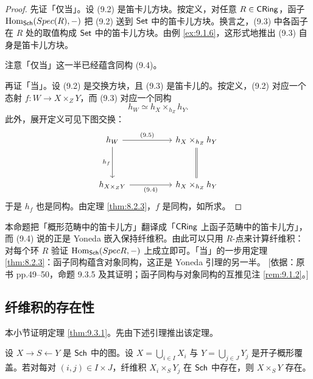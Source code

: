 \begin{proof}
先证「仅当」。设 (9.2) 是笛卡儿方块。按定义，对任意 $R \in \mathsf{CRing}$，函子 $\operatorname{Hom}_{\mathsf{Sch}}(Spec(R),-)$ 把 (9.2) 送到 $\mathsf{Set}$ 中的笛卡儿方块。换言之，(9.3) 中各函子在 $R$ 处的取值构成 $\mathsf{Set}$ 中的笛卡儿方块。由例 \ref{ex:9.1.6}，这形式地推出 (9.3) 自身是笛卡儿方块。

注意「仅当」这一半已经蕴含同构 (9.4)。

再证「当」。设 (9.2) 是交换方块，且 (9.3) 是笛卡儿的。按定义，(9.2) 对应一个态射 $f \colon W \to X \times_Z Y$，而 (9.3) 对应一个同构
\[
h_W \simeq h_X \times_{h_Z} h_Y .
\tag{9.5}
\]
此外，展开定义可见下图交换：
\[
\begin{tikzcd}[column sep=5em,row sep=3.6em]
h_W \arrow[r,"(9.5)"] \arrow[d,"h_f"'] & h_X \times_{h_Z} h_Y\\
h_{X \times_Z Y} \arrow[r,"(9.4)"'] & h_X \times_{h_Z} h_Y \arrow[u,equal]
\end{tikzcd}
\]
于是 $h_f$ 也是同构。由定理 \ref{thm:8.2.3}，$f$ 是同构，如所求。
\end{proof}

\begin{yizhu}
本命题把「概形范畴中的笛卡儿方」翻译成「$\mathsf{CRing}$ 上函子范畴中的笛卡儿方」，而 (9.4) 说的正是 Yoneda 嵌入保持纤维积。由此可以只用 $R$-点来计算纤维积：对每个环 $R$ 验证 $\operatorname{Hom}_{\mathsf{Sch}}(Spec R,-)$ 上成立即可。「当」的一步用定理 \ref{thm:8.2.3}：函子同构蕴含对象同构，这正是 Yoneda 引理的另一半。
[依据：原书 pp.49--50，命题 9.3.5 及其证明；函子同构与对象同构的互推见注 \ref{rem:9.1.2}。]
\end{yizhu}

\subsection{纤维积的存在性}\label{sec:9.4}

本小节证明定理 \ref{thm:9.3.1}。先由下述引理推出该定理。

\begin{lemma}\label{lem:9.4.1}
设 $X \to S \leftarrow Y$ 是 $\mathsf{Sch}$ 中的图。设 $X = \bigcup_{i \in I} X_i$ 与 $Y = \bigcup_{j \in J} Y_j$ 是开子概形覆盖。若对每对 $(i,j) \in I \times J$，纤维积 $X_i \times_S Y_j$ 在 $\mathsf{Sch}$ 中存在，则 $X \times_S Y$ 存在。
\end{lemma}


